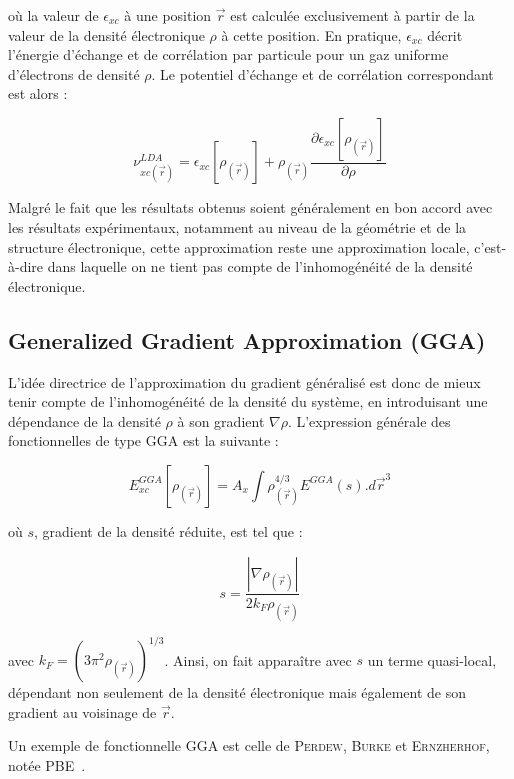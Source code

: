 \noindent où la valeur de $\epsilon_{xc}$ à une position $\vec{r}$ est calculée exclusivement à partir de la valeur de la densité électronique $\rho$ à cette position. En pratique, $\epsilon_{xc}$ décrit l’énergie d’échange et de corrélation par particule pour un gaz uniforme d’électrons de densité $\rho$. Le potentiel d’échange et de corrélation correspondant est alors :

\begin{equation}
\nu_{xc(\vec{r})}^{LDA} = \epsilon_{xc}[\rho_{(\vec{r})}] + \rho_{(\vec{r})} \frac{\partial \epsilon_{xc}[\rho_{(\vec{r})}]}{\partial \rho}
\end{equation}

Malgré le fait que les résultats obtenus soient généralement en bon accord avec les résultats expérimentaux, notamment au niveau de la géométrie et de la structure électronique, cette approximation reste une approximation locale, c'est-à-dire dans laquelle on ne tient pas compte de l’inhomogénéité de la densité électronique.

\subsection{Generalized Gradient Approximation (GGA)}

L’idée directrice de l’approximation du gradient généralisé est donc de mieux tenir compte de l’inhomogénéité de la densité du système, en introduisant une dépendance de la densité $\rho$ à son gradient $\nabla \rho$. L’expression générale des fonctionnelles de type GGA est la
suivante :

\begin{equation}
E_{xc}^{GGA}[\rho_{(\vec{r})}] = A_{x} \int \rho_{(\vec{r})}^{4/3} E^{GGA}(s) .d\vec{r}^{3}
\end{equation}

\noindent où $s$, gradient de la densité réduite, est tel que :

\begin{equation}
s = \frac{|\nabla \rho_{(\vec{r})}|}{2 k_{F} \rho_{(\vec{r})}}
\end{equation}

\noindent avec $k_{F} = (3 \pi^{2} \rho_{(\vec{r})})^{1/3}$. Ainsi, on fait apparaître avec $s$ un terme quasi-local, dépendant non seulement de la densité électronique mais également de son gradient au voisinage de $\vec{r}$.

Un exemple de fonctionnelle GGA est celle de \textsc{Perdew}, \textsc{Burke} et \textsc{Ernzherhof}, notée PBE~\cite{perdew1996generalized}.

